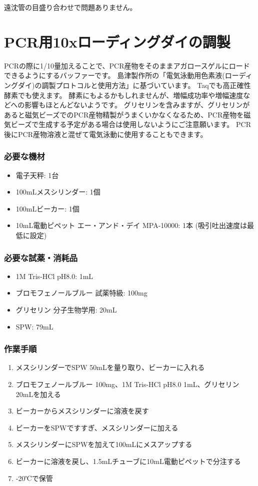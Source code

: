 \documentclass[titlepage,10pt,a4paper,uplatex]{jsbook}
\begin{document}
遠沈管の目盛り合わせで問題ありません。

\section{PCR用10xローディングダイの調製}\label{making10xloadingdye}

PCRの際に1/10量加えることで、PCR産物をそのままアガロースゲルにロードできるようにするバッファーです。
島津製作所の「電気泳動用色素液(ローディングダイ)の調製プロトコルと使用方法」に基づいています。
Taqでも高正確性酵素でも使えます。
酵素にもよるかもしれませんが、増幅成功率や増幅速度などへの影響もほとんどないようです。
グリセリンを含みますが、グリセリンがあると磁気ビーズでのPCR産物精製がうまくいかなくなるため、PCR産物を磁気ビーズで生成する予定がある場合は使用しないようにご注意願います。
PCR後にPCR産物溶液と混ぜて電気泳動に使用することもできます。

\subsubsection{必要な機材}
\begin{itemize}
\item 電子天秤: 1台
\item 100mLメスシリンダー: 1個
\item 100mLビーカー: 1個
\item 10mL電動ピペット エー・アンド・デイ MPA-10000: 1本 (吸引吐出速度は最低に設定)
\end{itemize}

\subsubsection{必要な試薬・消耗品}
\begin{itemize}
\item 1M Tris-HCl pH8.0: 1mL
\item ブロモフェノールブルー 試薬特級: 100mg
\item グリセリン 分子生物学用: 20mL
\item SPW: 79mL
\end{itemize}

\subsubsection{作業手順}
\begin{enumerate}
\item メスシリンダーでSPW 50mLを量り取り、ビーカーに入れる
\item ブロモフェノールブルー 100mg、1M Tris-HCl pH8.0 1mL、グリセリン20mLを加える
\item ビーカーからメスシリンダーに溶液を戻す
\item ビーカーをSPWですすぎ、メスシリンダーに加える
\item メスシリンダーにSPWを加えて100mLにメスアップする
\item ビーカーに溶液を戻し、1.5mLチューブに10mL電動ピペットで分注する
\item -20℃で保管
\end{enumerate}
\end{document}
